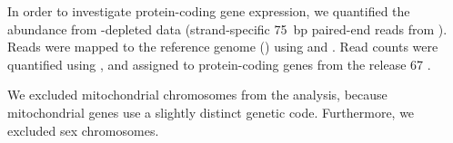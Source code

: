 In order to investigate protein-coding gene expression, we quantified the \mrna
abundance from \rrna-depleted \rnaseq data (strand-specific \SI{75}{bp}
paired-end reads from  ). Reads were mapped to
the \mmu reference genome () using 
\citep{Fonseca:2014} and  \citep{Kim:2013}. Read counts were
quantified using  \citep{Anders:2014}, and assigned to
protein-coding genes from the  release \num{67}
\citep{Flicek:2014}.

We excluded mitochondrial chromosomes from the analysis, because mitochondrial
genes use a slightly distinct genetic code\todo[ref]{}. Furthermore, we excluded
sex chromosomes.
